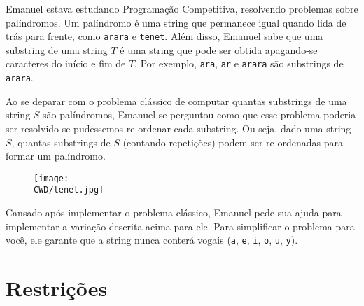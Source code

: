 %

Emanuel estava estudando Programação Competitiva, resolvendo problemas sobre palíndromos. Um palíndromo é uma string que permanece igual quando lida de trás para frente, como {\tt arara} e {\tt tenet}. Além disso, Emanuel sabe que uma substring de uma string $T$ é uma string que pode ser obtida apagando-se caracteres do início e fim de $T$. Por exemplo, {\tt ara}, {\tt ar} e {\tt arara} são substrings de {\tt arara}.

Ao se deparar com o problema clássico de computar quantas substrings de uma string $S$ são palíndromos, Emanuel se perguntou como que esse problema poderia ser resolvido se pudessemos re-ordenar cada substring. Ou seja, dado uma string $S$, quantas substrings de $S$ (contando repetições) podem ser re-ordenadas para formar um palíndromo.

\begin{figure}[H]
    \centering
    \texttt{[image: \\CWD/tenet.jpg]}
\end{figure}

Cansado após implementar o problema clássico, Emanuel pede sua ajuda para implementar a variação descrita acima para ele. Para simplificar o problema para você, ele garante que a string nunca conterá vogais ({\tt a}, {\tt e}, {\tt i}, {\tt o}, {\tt u}, {\tt y}).

%
%

%
%



\section*{Restrições}


